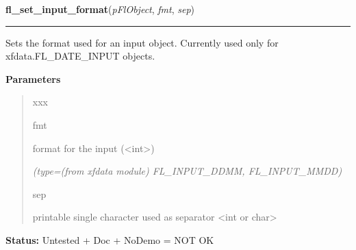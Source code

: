 \hspace{.8\funcindent}\begin{boxedminipage}{\funcwidth}

    \raggedright \textbf{fl\_set\_input\_format}(\textit{pFlObject}, \textit{fmt}, \textit{sep})

    \vspace{-1.5ex}

    \rule{\textwidth}{0.5\fboxrule}
\setlength{\parskip}{2ex}
    Sets the format used for an input object. Currently used only for 
    xfdata.FL\_DATE\_INPUT objects.

\setlength{\parskip}{1ex}
      \textbf{Parameters}
      \vspace{-1ex}

      \begin{quote}
        \begin{Ventry}{xxx}

          \item[fmt]

          format for the input ({\textless}int{\textgreater})

            {\it (type=(from xfdata module) FL\_INPUT\_DDMM, FL\_INPUT\_MMDD)}

          \item[sep]

          printable single character used as separator {\textless}int or 
          char{\textgreater}

        \end{Ventry}

      \end{quote}

\textbf{Status:} Untested + Doc + NoDemo = NOT OK



    \end{boxedminipage}

    \label{xformslib:flinput:fl_set_input_hscrollbar}

    \vspace{0.5ex}

